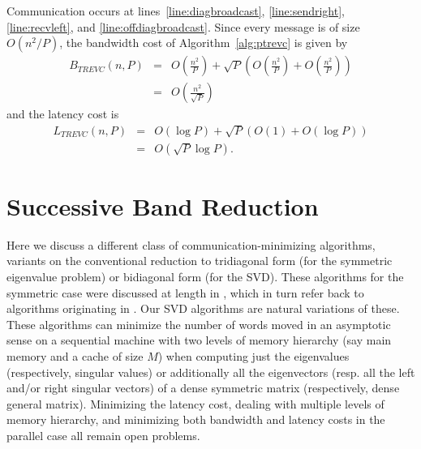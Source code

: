 \documentclass{article}
\def\lt{\left}
\def\rt{\right}
\theoremstyle{definition}
\begin{document}
Communication occurs at lines~\ref{line:diagbroadcast}, \ref{line:sendright}, \ref{line:recvleft}, and \ref{line:offdiagbroadcast}.  Since every message is of size $O(n^2 / P)$, the bandwidth cost of Algorithm~\ref{alg:ptrevc} is given by
\begin{eqnarray*}
B_{TREVC}(n,P) &=& O\lt(\frac{n^2}{P} \rt) + \sqrt P \lt(O\lt(\frac{n^2}{P}\rt) + O\lt(\frac{n^2}{P} \rt)\rt) \\
 &=& O\lt(\frac{n^2}{\sqrt P} \rt)
 \end{eqnarray*}
 and the latency cost is
 \begin{eqnarray*}
L_{TREVC}(n,P) &=& O\lt(\log P\rt) + \sqrt P \lt(O\lt(1\rt) + O\lt(\log P\rt)\rt) \\
 &=& O\lt(\sqrt P \log P\rt).
 \end{eqnarray*}

\section{Successive Band Reduction}
\label{sec_SBR}

Here we discuss a different class of communication-minimizing algorithms, variants on the conventional reduction to tridiagonal form (for the symmetric eigenvalue problem) or bidiagonal form (for the SVD). These algorithms for the symmetric case were discussed at length in \cite{SBR1,SBR2}, which in turn refer back to algorithms originating in \cite{Rutishauser63,Schwarz68}. Our SVD algorithms are natural variations of these. These algorithms can minimize the number of words moved in an asymptotic sense on a sequential machine with two levels of memory hierarchy (say main memory and a cache of size $M$) when computing just the eigenvalues (respectively, singular values) or additionally all the eigenvectors (resp. all the left and/or right singular vectors) of a dense symmetric matrix (respectively, dense general matrix). Minimizing the latency cost, dealing with multiple levels of memory hierarchy, and minimizing both bandwidth and latency costs in the parallel case all remain open problems.
\end{document}
